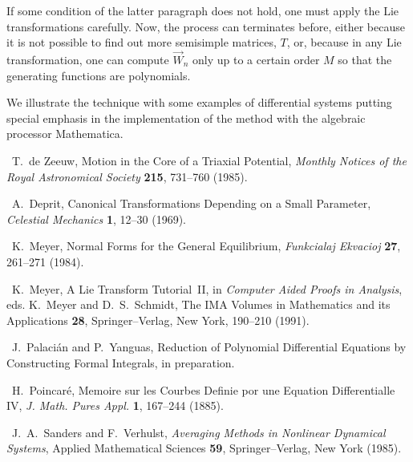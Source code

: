 If some condition of the latter paragraph does not hold, one must
apply the Lie transformations carefully. Now, the process can terminates
before,
either because it is not possible to find out more semisimple matrices,
$T$, or, because
in any Lie transformation, one can compute $\Vec{W}_n$ only up to a certain
order
$M$ so that the generating functions are polynomials.

We illustrate the technique with some examples of differential systems
putting special emphasis in the implementation of the method with the
algebraic
processor {\sc Mathematica}.



 {\small
\begin{thebibliography}{}

\item[1.]~T.~de Zeeuw, Motion in the Core of a Triaxial Potential, {\sl
Monthly
Notices of the Royal Astronomical Society\/}
{\bf 215}, 731--760 (1985).

\item[2.]~A.~Deprit, Canonical Transformations Depending on a Small Parameter,
{\sl Celestial Mechanics\/} {\bf 1}, 12--30
(1969).

\item[3.]~K.~Meyer, Normal Forms for the General Equilibrium,
{\sl Funkcialaj Ekvacioj\/} {\bf 27}, 261--271 (1984).

\item[4.]~K.~Meyer, A Lie Transform Tutorial~II,
in {\sl Computer Aided Proofs in Analysis}, eds. K.~Meyer and
D.~S.~Schmidt,  The IMA Volumes in Mathematics and its Applications {\bf 28},
Springer--Verlag, New York, 190--210 (1991).

\item[5.]~J.~Palaci\'an and P.~Yanguas, Reduction of Polynomial Differential
Equations by Constructing Formal Integrals, in preparation.

\item[6.]~H.~Poincar\'e, Memoire sur les Courbes Definie por une Equation
Differentialle IV, {\sl J. Math. Pures Appl.\/} {\bf 1}, 167--244 (1885).

\item[7.]~J.~A.~Sanders and F.~Verhulst, {\sl Averaging Methods in Nonlinear
Dynamical Systems}, Applied Mathematical Sciences {\bf 59},
Springer--Verlag, New
York (1985).
\end{thebibliography}}




